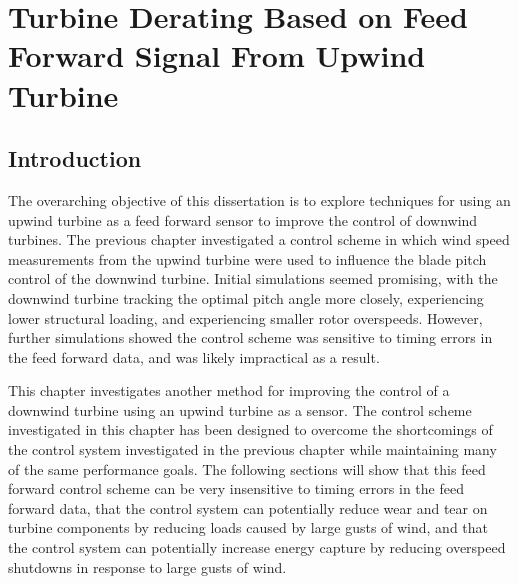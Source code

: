 
\chapter{Turbine Derating Based on Feed Forward Signal From Upwind Turbine} %

\label{Chapter4} %



\section{Introduction} \label{section4-1}

The overarching objective of this dissertation is to explore techniques for using an upwind turbine as a feed forward sensor to improve the control of downwind turbines. The previous chapter investigated a control scheme in which wind speed measurements from the upwind turbine were used to influence the blade pitch control of the downwind turbine. Initial simulations seemed promising, with the downwind turbine tracking the optimal pitch angle more closely, experiencing lower structural loading, and experiencing smaller rotor overspeeds. However, further simulations showed the control scheme was sensitive to timing errors in the feed forward data, and was likely impractical as a result. 

This chapter investigates another method for improving the control of a downwind turbine using an upwind turbine as a sensor. The control scheme investigated in this chapter has been designed to overcome the shortcomings of the control system investigated in the previous chapter while maintaining many of the same performance goals. The following sections will show that this feed forward control scheme can be very insensitive to timing errors in the feed forward data, that the control system can potentially reduce wear and tear on turbine components by reducing loads caused by large gusts of wind, and that the control system can potentially increase energy capture by reducing overspeed shutdowns in response to large gusts of wind.

